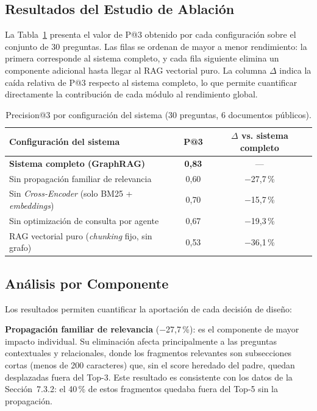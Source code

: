 \subsection{Resultados del Estudio de Ablación}

La Tabla~\ref{tab:ablacion} presenta el valor de P@3 obtenido por cada configuración sobre el conjunto de 30 preguntas. Las filas se ordenan de mayor a menor rendimiento: la primera corresponde al sistema completo, y cada fila siguiente elimina un componente adicional hasta llegar al RAG vectorial puro. La columna $\Delta$ indica la caída relativa de P@3 respecto al sistema completo, lo que permite cuantificar directamente la contribución de cada módulo al rendimiento global.

\begin{table}[ht]
\centering
\renewcommand{\arraystretch}{1.4}
\caption{Precision@3 por configuración del sistema (30 preguntas, 6 documentos públicos).}
\label{tab:ablacion}
\begin{tabularx}{\textwidth}{|X|c|c|}
\hline
\textbf{Configuración del sistema} & \textbf{P@3} & \textbf{$\Delta$ vs. sistema completo} \\ \hline
\textbf{Sistema completo (GraphRAG)} & \textbf{0{,}83} & — \\ \hline
Sin propagación familiar de relevancia & 0{,}60 & $-$27{,}7\,\% \\ \hline
Sin \textit{Cross-Encoder} (solo BM25 + \textit{embeddings}) & 0{,}70 & $-$15{,}7\,\% \\ \hline
Sin optimización de consulta por agente & 0{,}67 & $-$19{,}3\,\% \\ \hline
RAG vectorial puro (\textit{chunking} fijo, sin grafo) & 0{,}53 & $-$36{,}1\,\% \\ \hline
\end{tabularx}
\end{table}

\subsection{Análisis por Componente}

Los resultados permiten cuantificar la aportación de cada decisión de diseño:

\textbf{Propagación familiar de relevancia} ($-$27,7\,\%): es el componente de mayor impacto individual. Su eliminación afecta principalmente a las preguntas contextuales y relacionales, donde los fragmentos relevantes son subsecciones cortas (menos de 200 caracteres) que, sin el score heredado del padre, quedan desplazadas fuera del Top-3. Este resultado es consistente con los datos de la Sección~7.3.2: el 40\,\% de estos fragmentos quedaba fuera del Top-5 sin la propagación.


